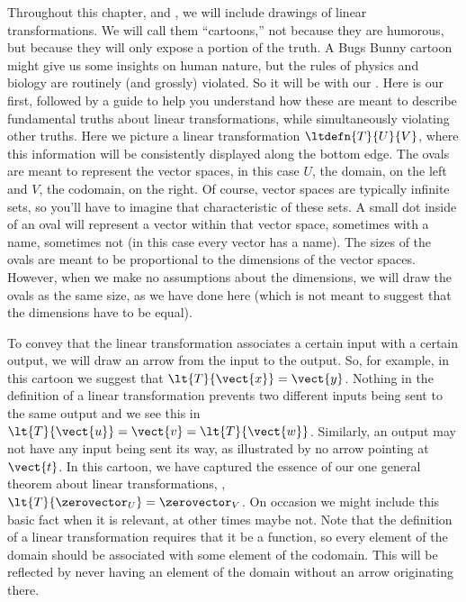 %
%
%
Throughout this chapter, and , we will include drawings of linear transformations.  We will call them ``cartoons,'' not because they are humorous, but because they will only expose a portion of the truth.  A Bugs Bunny cartoon might give us some insights on human nature, but the rules of physics and biology are routinely (and grossly) violated.  So it will be with our .  Here is our first, followed by a guide to help you understand how these are meant to describe fundamental truths about linear transformations, while simultaneously violating other truths.
%
%
Here we picture a linear transformation $\ltdefn{T}{U}{V}$, where this information will be consistently displayed along the bottom edge.  The ovals are meant to represent the vector spaces, in this case $U$, the domain, on the left and $V$, the codomain, on the right.  Of course, vector spaces are typically infinite sets, so you'll have to imagine that characteristic of these sets.  A small dot inside of an oval will represent a vector within that vector space, sometimes with a name, sometimes not (in this case every vector has a name).  The sizes of the ovals are meant to be proportional to the dimensions of the vector spaces.  However, when we make no assumptions about the dimensions, we will draw the ovals as the same size, as we have done here (which is not meant to suggest that the dimensions have to be equal).\par
%
To convey that the linear transformation associates a certain input with a certain output, we will draw an arrow from the input to the output.  So, for example, in this cartoon we suggest that $\lt{T}{\vect{x}}=\vect{y}$.  Nothing in the definition of a linear transformation prevents two different inputs being sent to the same output and we see this in $\lt{T}{\vect{u}}=\vect{v}=\lt{T}{\vect{w}}$.  Similarly, an output may not have any input being sent its way, as illustrated by no arrow pointing at $\vect{t}$.  In this cartoon, we have captured the essence of our one general theorem about linear transformations, , $\lt{T}{\zerovector_U}=\zerovector_V$.  On occasion we might include this basic fact when it is relevant, at other times maybe not.  Note that the definition of a linear transformation requires that it be a function, so every element of the domain should be associated with some element of the codomain.  This will be reflected by never having an element of the domain without an arrow originating there.\par
